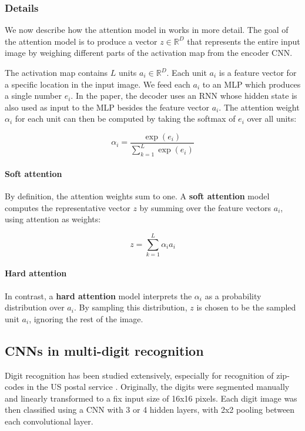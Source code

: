 \subsubsection{Details}
We now describe how the attention model in \cite{AttendAndTell} works in more detail.
The goal of the attention model is to produce a vector $z \in \mathbb{R}^D$ that represents the entire input image by weighing different parts of the activation map from the encoder CNN.

The activation map contains $L$ units $a_i \in \mathbb{R}^D$.
Each unit $a_i$ is a feature vector for a specific location in the input image. We feed each $a_i$ to an MLP which produces a single number $e_i$. In the paper, the decoder uses an RNN whose hidden state is also used as input to the MLP besides the feature vector $a_i$.
The attention weight $\alpha_i$ for each unit can then be computed by taking the softmax of $e_i$ over all units:

\[
\alpha_i = \frac{ \exp(e_i) }{ \sum_{k=1}^L \exp(e_i) }
\]

\paragraph{Soft attention}
By definition, the attention weights sum to one. A \textbf{soft attention} model computes the representative vector $z$ by summing over the feature vectors $a_i$, using attention as weights:

\[
z = \sum_{k=1}^L \alpha_i a_i
\]

\paragraph{Hard attention}
In contrast, a \textbf{hard attention} model interprets the $\alpha_i$ as a probability distribution over $a_i$. By sampling this distribution, $z$ is chosen to be the sampled unit $a_i$, ignoring the rest of the image.


\subsection{CNNs in multi-digit recognition}

Digit recognition has been studied extensively, especially for recognition of zip-codes in the US postal service \cite{lecun_1989, lecun_1990}. Originally, the digits were segmented manually and linearly transformed to a fix input size of 16x16 pixels.
Each digit image was then classified using a CNN with 3 or 4 hidden layers, with 2x2 pooling between each convolutional layer.


